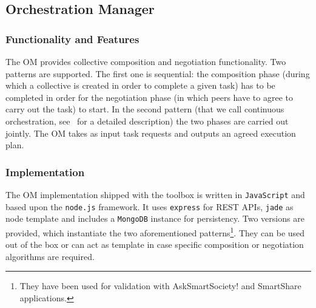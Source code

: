 \subsection{Orchestration Manager}
\subsubsection{Functionality and Features}
The OM provides collective composition and negotiation functionality. Two patterns are supported. The first one is sequential: the composition phase (during which a collective is created in order to complete a given task) has to be completed in order for the negotiation phase (in which peers have to agree to carry out the task) to start. In the second pattern (that we call continuous orchestration, see~\cite{D6.2} for a detailed description) the two phases are carried out jointly. The OM takes as input task requests and outputs an agreed execution plan. 
\subsubsection{Implementation}
The OM implementation shipped with the toolbox is written in {\tt JavaScript} and based upon the {\tt node.js} framework. It uses {\tt express} for REST APIs, {\tt jade} as node template and includes a {\tt MongoDB} instance for persistency. Two versions are provided, which instantiate the two aforementioned patterns\footnote{They have been used for validation with AskSmartSociety! and SmartShare applications.}. 
They can be used out of the box or can act as template in case specific composition or negotiation algorithms are required. %

